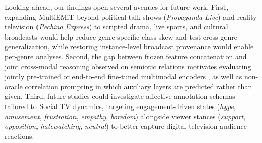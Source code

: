 Looking ahead, our findings open several avenues for future work. First, expanding MultiEMiT beyond political talk shows (\textit{Propaganda Live}) and reality television (\textit{Pechino Express}) to scripted drama, live sports, and cultural broadcasts would help reduce genre-specific class skew and test cross-genre generalization, while restoring instance-level broadcast provenance would enable per-genre analyses. Second, the gap between frozen feature concatenation and joint cross-modal reasoning observed on semiotic relations motivates evaluating jointly pre-trained or end-to-end fine-tuned multimodal encoders \cite{radford2021clip}, as well as non-oracle correlation prompting in which auxiliary layers are predicted rather than given. Third, future studies could investigate affective annotation schemas tailored to Social TV dynamics, targeting engagement-driven states (\textit{hype}, \textit{amusement}, \textit{frustration}, \textit{empathy}, \textit{boredom}) alongside viewer stances (\textit{support}, \textit{opposition}, \textit{hatewatching}, \textit{neutral}) to better capture digital television audience reactions.